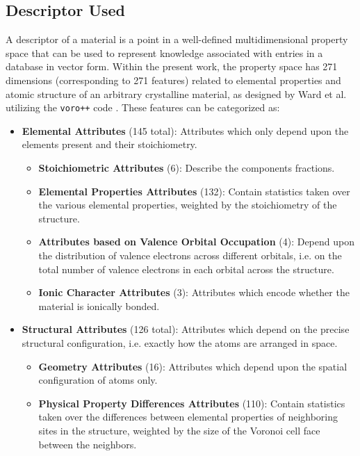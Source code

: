 \subsection{Descriptor Used} \label{sipfenn:ssec:descriptorused}
A descriptor of a material is a point in a well-defined multidimensional property space that can be used to represent knowledge associated with entries in a database in vector form. Within the present work, the property space has 271 dimensions (corresponding to 271 features) related to elemental properties and atomic structure of an arbitrary crystalline material, as designed by Ward et al. \cite{Ward2016AMaterials, Ward2017IncludingTessellations} utilizing the \texttt{voro++} code \cite{rycroft2009voro++}. These features can be categorized as:

\begin{itemize}
    \item \textbf{Elemental Attributes} (145 total): Attributes which only depend upon the elements present and their stoichiometry.
    \begin{itemize}
        \item \textbf{Stoichiometric Attributes} (6): Describe the components fractions.
        \item \textbf{Elemental Properties Attributes} (132): Contain statistics taken over the various elemental properties, weighted by the stoichiometry of the structure.
        \item \textbf{Attributes based on Valence Orbital Occupation} (4): Depend upon the distribution of valence electrons across different orbitals, i.e. on the total number of valence electrons in each orbital across the structure.
        \item \textbf{Ionic Character Attributes} (3): Attributes which encode whether the material is ionically bonded. 
    \end{itemize}
    \item \textbf{Structural Attributes} (126 total): Attributes which depend on the precise structural configuration, i.e. exactly how the atoms are arranged in space.
    \begin{itemize}
        \item \textbf{Geometry Attributes} (16): Attributes which depend upon the spatial configuration of atoms only.
        \item \textbf{Physical Property Differences Attributes} (110): Contain statistics taken over the differences between elemental properties of neighboring sites in the structure, weighted by the size of the Voronoi cell face between the neighbors.
    \end{itemize}
\end{itemize}

